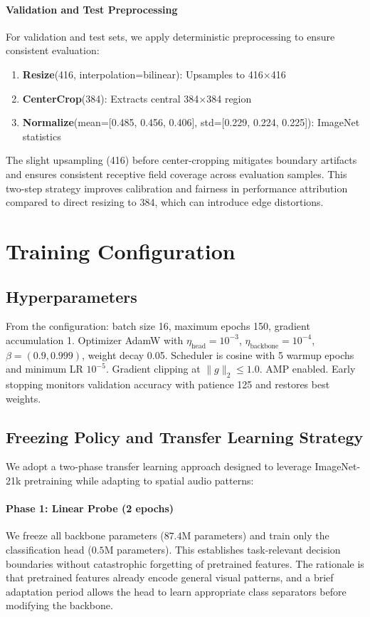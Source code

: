 \documentclass[11pt,a4paper]{article}
\begin{document}
\paragraph{Validation and Test Preprocessing}
For validation and test sets, we apply deterministic preprocessing to ensure consistent evaluation:
\begin{enumerate}[leftmargin=*]
\item \textbf{Resize}(416, interpolation=bilinear): Upsamples to 416\(\times\)416
\item \textbf{CenterCrop}(384): Extracts central 384\(\times\)384 region
\item \textbf{Normalize}(mean=[0.485, 0.456, 0.406], std=[0.229, 0.224, 0.225]): ImageNet statistics
\end{enumerate}

The slight upsampling (416) before center-cropping mitigates boundary artifacts and ensures consistent receptive field coverage across evaluation samples. This two-step strategy improves calibration \cite{guo2017calibration} and fairness in performance attribution compared to direct resizing to 384, which can introduce edge distortions.

\section{Training Configuration}
\subsection{Hyperparameters}
From the configuration: batch size 16, maximum epochs 150, gradient accumulation 1. Optimizer AdamW with \(\eta_{\text{head}}=10^{-3}\), \(\eta_{\text{backbone}}=10^{-4}\), \(\beta=(0.9,0.999)\), weight decay 0.05. Scheduler is cosine with 5 warmup epochs and minimum LR \(10^{-5}\). Gradient clipping at \(\lVert g \rVert_2 \leq 1.0\). AMP enabled. Early stopping monitors validation accuracy with patience 125 and restores best weights.

\subsection{Freezing Policy and Transfer Learning Strategy}
We adopt a two-phase transfer learning approach designed to leverage ImageNet-21k pretraining while adapting to spatial audio patterns:

\paragraph{Phase 1: Linear Probe (2 epochs)} We freeze all backbone parameters (\(87.4\)M parameters) and train only the classification head (\(0.5\)M parameters). This establishes task-relevant decision boundaries without catastrophic forgetting of pretrained features. The rationale is that pretrained features already encode general visual patterns, and a brief adaptation period allows the head to learn appropriate class separators before modifying the backbone.
\end{document}
